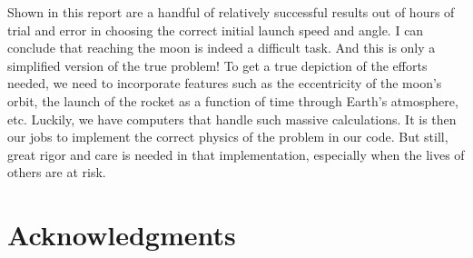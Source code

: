 \documentclass[aps,prl,twocolumn,superscriptaddress]{revtex4-1}
\begin{document}
Shown in this report are a handful of relatively successful results out of hours of trial and error in choosing the correct initial launch speed and angle. I can conclude that reaching the moon is indeed a difficult task. And this is only a simplified version of the true problem! To get a true depiction of the efforts needed, we need to incorporate features such as the eccentricity of the moon's orbit, the launch of the rocket as a function of time through Earth's atmosphere, etc. Luckily, we have computers that handle such massive calculations. It is then our jobs to implement the correct physics of the problem in our code. But still, great rigor and care is needed in that implementation, especially when the lives of others are at risk.

\section*{Acknowledgments}
\setlength{\parindent}{0cm}



\end{document}
